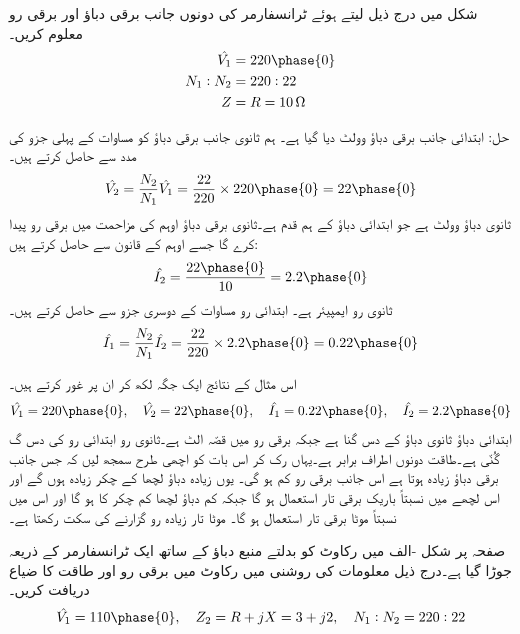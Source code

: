 شکل    میں درج ذیل لیتے ہوئے ٹرانسفارمر کی دونوں جانب برقی دباؤ اور برقی رو معلوم کریں۔
\begin{align*}
\hat{V_1}&=220 \phase{0}\\
N_1:N_2&=220:22\\
Z&=R=\SI{10}{\ohm}
\end{align*}


حل:\quad 
ابتدائی جانب برقی دباؤ   وولٹ دیا گیا ہے۔ ہم  ثانوی جانب برقی دباؤ کو مساوات  کے پہلی جزو کی مدد سے حاصل کرتے ہیں۔
\begin{align*}
\hat{V_2}=\frac{N_2}{N_1} \hat{V_1}=\frac{22}{220} \times 220\phase {0}=22\phase{0}
\end{align*}
ثانوی دباؤ  وولٹ ہے جو ابتدائی  دباؤ کے ہم قدم ہے۔ثانوی برقی دباؤ  اوہم کی مزاحمت میں برقی رو پیدا کرے گا جسے اوہم کے قانون سے حاصل کرتے ہیں:
\begin{align*}
\hat{I_2}=\frac{22 \phase {0}}{10}=2.2\phase {0}
\end{align*}
ثانوی رو  ایمپیئر  ہے۔ ابتدائی رو مساوات  کے دوسری جزو سے حاصل کرتے ہیں۔
\begin{align*}
\hat{I_1}=\frac{N_2}{N_1} \hat{I_2}=\frac{22}{220} \times 2.2\phase{0}=0.22\phase{0}
\end{align*}

اس مثال کے نتائج ایک جگہ لکھ کر ان پر غور کرتے ہیں۔
\begin{align*}
\hat{V_1}=220\phase{0}, \quad \hat{V_2}=22\phase{0}, \quad \hat{I_1}=0.22\phase{0}, \quad \hat{I_2}=2.2\phase{0}
\end{align*}
ابتدائی دباؤ ثانوی  دباؤ کے دس گنا ہے جبکہ برقی رو میں قصّہ الٹ ہے۔ثانوی رو ابتدائی رو کی  دس گ گُنّی ہے۔طاقت دونوں اطراف  برابر ہے۔یہاں رک کر  اس بات کو اچھی طرح سمجھ لیں کہ جس جانب برقی دباؤ زیادہ ہوتا ہے اس جانب برقی رو کم ہو گی۔ یوں زیادہ دباؤ  لچھا کے چکر زیادہ ہوں گے اور اس لچھے میں نسبتاً باریک برقی تار استعمال ہو گا جبکہ کم  دباؤ لچھا کم چکر کا ہو گا اور اس میں نسبتاً موٹا  برقی تار استعمال ہو گا۔ موٹا  تار زیادہ رو گزارنے  کی سکت رکھتا ہے۔ 


صفحہ  پر شکل -الف  میں رکاوٹ  کو  بدلتے منبع دباؤ  کے ساتھ ایک ٹرانسفارمر کے ذریعہ جوڑا گیا ہے۔درج ذیل معلومات کی روشنی میں رکاوٹ میں برقی رو اور طاقت کا ضیاع دریافت کریں۔
\begin{align*}
\hat{V_1}=110\phase{0},\quad Z_2=R+j X=3+j 2,\quad N_1:N_2=220:22 
\end{align*}

